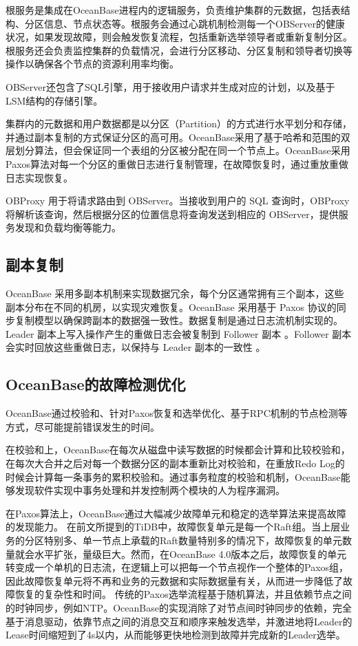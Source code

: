 根服务是集成在OceanBase进程内的逻辑服务，负责维护集群的元数据，包括表结构、分区信息、节点状态等。根服务会通过心跳机制检测每一个OBServer的健康状况，如果发现故障，则会触发恢复流程，包括重新选举领导者或重新复制分区。根服务还会负责监控集群的负载情况，会进行分区移动、分区复制和领导者切换等操作以确保各个节点的资源利用率均衡。

OBServer还包含了SQL引擎，用于接收用户请求并生成对应的计划，以及基于LSM结构的存储引擎。

集群内的元数据和用户数据都是以分区（Partition）的方式进行水平划分和存储，并通过副本复制的方式保证分区的高可用。OceanBase采用了基于哈希和范围的双层划分算法，但会保证同一个表组的分区被分配在同一个节点上。OceanBase采用Paxos算法对每一个分区的重做日志进行复制管理，在故障恢复时，通过重放重做日志实现恢复。

OBProxy 用于将请求路由到 OBServer。当接收到用户的 SQL 查询时，OBProxy 将解析该查询，然后根据分区的位置信息将查询发送到相应的 OBServer，提供服务发现和负载均衡等能力。


\subsection{副本复制}

OceanBase 采用多副本机制来实现数据冗余，每个分区通常拥有三个副本，这些副本分布在不同的机房，以实现灾难恢复。OceanBase 采用基于 Paxos 协议的同步复制模型以确保跨副本的数据强一致性。数据复制是通过日志流机制实现的。Leader 副本上写入操作产生的重做日志会被复制到 Follower 副本 。Follower 副本会实时回放这些重做日志，以保持与 Leader 副本的一致性 。


\subsection{OceanBase的故障检测优化}

OceanBase通过校验和、针对Paxos恢复和选举优化、基于RPC机制的节点检测等方式，尽可能提前错误发生的时间。

在校验和上，OceanBase在每次从磁盘中读写数据的时候都会计算和比较校验和，在每次大合并之后对每一个数据分区的副本重新比对校验和，在重放Redo Log的时候会计算每一条事务的累积校验和。通过事务粒度的校验和机制，OceanBase能够发现软件实现中事务处理和并发控制两个模块的人为程序漏洞。

在Paxos算法上，OceanBase通过大幅减少故障单元和稳定的选举算法来提高故障的发现能力。
在前文所提到的TiDB中，故障恢复单元是每一个Raft组。当上层业务的分区特别多、单一节点上承载的Raft数量特别多的情况下，故障恢复的单元数量就会水平扩张，量级巨大。然而，在OceanBase 4.0版本之后，故障恢复的单元转变成一个单机的日志流，在逻辑上可以把每一个节点视作一个整体的Paxos组，因此故障恢复单元将不再和业务的元数据和实际数据量有关，从而进一步降低了故障恢复的复杂性和时间。
传统的Paxos选举流程基于随机算法，并且依赖节点之间的时钟同步，例如NTP。OceanBase的实现消除了对节点间时钟同步的依赖，完全基于消息驱动，依靠节点之间的消息交互和顺序来触发选举，并激进地将Leader的Lease时间缩短到了4s以内，从而能够更快地检测到故障并完成新的Leader选举。

